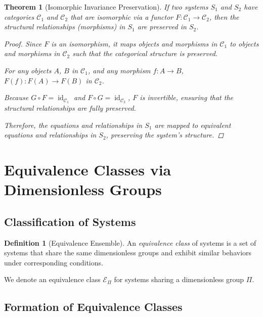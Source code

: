 \documentclass{article}
\newtheorem{theorem}{Theorem}[section]
\theoremstyle{definition}
\newtheorem{definition}{Definition}[section]
\theoremstyle{remark}
\begin{document}
	\begin{theorem}[Isomorphic Invariance Preservation]
		If two systems $S_1$ and $S_2$ have categories $\mathcal{C}_1$ and $\mathcal{C}_2$ that are isomorphic via a functor $F: \mathcal{C}_1 \rightarrow \mathcal{C}_2$, then the structural relationships (morphisms) in $S_1$ are preserved in $S_2$.
		
		\begin{proof}
			Since $F$ is an isomorphism, it maps objects and morphisms in $\mathcal{C}_1$ to objects and morphisms in $\mathcal{C}_2$ such that the categorical structure is preserved.
			
			For any objects $A$, $B$ in $\mathcal{C}_1$, and any morphism $f: A \rightarrow B$, $F(f): F(A) \rightarrow F(B)$ in $\mathcal{C}_2$.
			
			Because $G \circ F = \operatorname{id}_{\mathcal{C}_1}$ and $F \circ G = \operatorname{id}_{\mathcal{C}_2}$, $F$ is invertible, ensuring that the structural relationships are fully preserved.
			
			Therefore, the equations and relationships in $S_1$ are mapped to equivalent equations and relationships in $S_2$, preserving the system's structure.
		\end{proof}
	\end{theorem}
	
	\section{Equivalence Classes via Dimensionless Groups}
	
	\subsection{Classification of Systems}
	
	\begin{definition}[Equivalence Ensemble]
		An \emph{equivalence class} of systems is a set of systems that share the same dimensionless groups and exhibit similar behaviors under corresponding conditions.
		
		We denote an equivalence class $\mathcal{E}_\Pi$ for systems sharing a dimensionless group $\Pi$.
	\end{definition}
	
	\subsection{Formation of Equivalence Classes}
	
\end{document}
